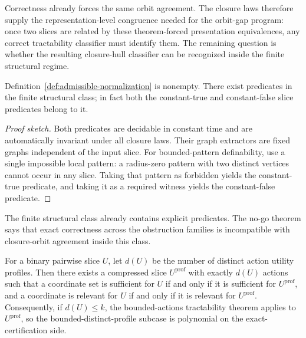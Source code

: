 Correctness already forces the same orbit agreement. The closure laws therefore supply the representation-level congruence needed for the orbit-gap program: once two slices are related by these theorem-forced presentation equivalences, any correct tractability classifier must identify them. The remaining question is whether the resulting closure-hull classifier can be recognized inside the finite structural regime.

\begin{proposition}\label{prop:admissibility-inhabited}
Definition~\ref{def:admissible-normalization} is nonempty. There exist predicates in the finite structural class; in fact both the constant-true and constant-false slice predicates belong to it.
\end{proposition}

\begin{proof}[Proof sketch]
Both predicates are decidable in constant time and are automatically invariant under all closure laws. Their graph extractors are fixed graphs independent of the input slice. For bounded-pattern definability, use a single impossible local pattern: a radius-zero pattern with two distinct vertices cannot occur in any slice. Taking that pattern as forbidden yields the constant-true predicate, and taking it as a required witness yields the constant-false predicate.
\end{proof}

The finite structural class already contains explicit predicates. The no-go theorem says that exact correctness across the obstruction families is incompatible with closure-orbit agreement inside this class.

\begin{proposition}\label{prop:distinct-profile-compression}
For a binary pairwise slice $U$, let $d(U)$ be the number of distinct action utility profiles. Then there exists a compressed slice $U^{\mathrm{prof}}$ with exactly $d(U)$ actions such that a coordinate set is sufficient for $U$ if and only if it is sufficient for $U^{\mathrm{prof}}$, and a coordinate is relevant for $U$ if and only if it is relevant for $U^{\mathrm{prof}}$. Consequently, if $d(U) \le k$, the bounded-actions tractability theorem applies to $U^{\mathrm{prof}}$, so the bounded-distinct-profile subcase is polynomial on the exact-certification side.
\end{proposition}

